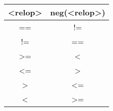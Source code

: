 \documentclass[12pt]{article}
\begin{document}
\begin{table}[h]
\centering
\begin{tabular}{|c|c|}
\hline
\textless{}relop\textgreater{} & neg(\textless{}relop\textgreater{}) \\ \hline
==                             & !=                                  \\ \hline
!=                             & ==                                  \\ \hline
\textgreater{}=                & \textless{}                         \\ \hline
\textless{}=                   & \textgreater{}                      \\ \hline
\textgreater{}                 & \textless{}=                        \\ \hline
\textless{}                    & \textgreater{}=                     \\ \hline
\end{tabular}
\end{table}
\end{document}
